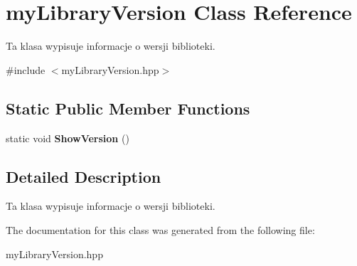 \hypertarget{classmyLibraryVersion}{
\section{myLibraryVersion Class Reference}
\label{classmyLibraryVersion}
}


Ta klasa wypisuje informacje o wersji biblioteki.  




{\ttfamily \#include $<$myLibraryVersion.hpp$>$}

\subsection*{Static Public Member Functions}
\begin{DoxyCompactItemize}
\item 
\hypertarget{classmyLibraryVersion_aea0fc3915ec214281e270788f9c55beb}{
static void {\bfseries ShowVersion} ()}
\label{classmyLibraryVersion_aea0fc3915ec214281e270788f9c55beb}

\end{DoxyCompactItemize}


\subsection{Detailed Description}
Ta klasa wypisuje informacje o wersji biblioteki. 

The documentation for this class was generated from the following file:\begin{DoxyCompactItemize}
\item 
myLibraryVersion.hpp\end{DoxyCompactItemize}
